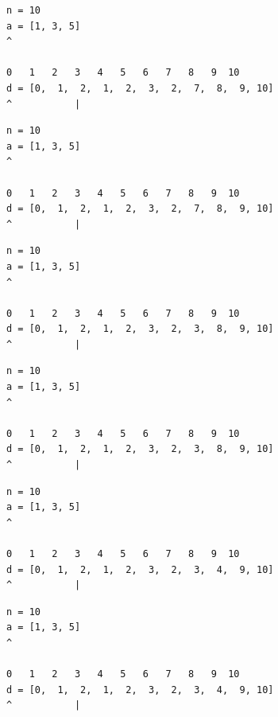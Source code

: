 \begin{frame}[fragile]
\begin{verbatim}
n = 10
a = [1, 3, 5]
^

0   1   2   3   4   5   6   7   8   9  10
d = [0,  1,  2,  1,  2,  3,  2,  7,  8,  9, 10]
^           |
\end{verbatim}
\end{frame}
\addtocounter{framenumber}{-1}

\begin{frame}[fragile]
\begin{verbatim}
n = 10
a = [1, 3, 5]
^

0   1   2   3   4   5   6   7   8   9  10
d = [0,  1,  2,  1,  2,  3,  2,  7,  8,  9, 10]
^           |
\end{verbatim}
\end{frame}
\addtocounter{framenumber}{-1}

\begin{frame}[fragile]
\begin{verbatim}
n = 10
a = [1, 3, 5]
^

0   1   2   3   4   5   6   7   8   9  10
d = [0,  1,  2,  1,  2,  3,  2,  3,  8,  9, 10]
^           |
\end{verbatim}
\end{frame}
\addtocounter{framenumber}{-1}

\begin{frame}[fragile]
\begin{verbatim}
n = 10
a = [1, 3, 5]
^

0   1   2   3   4   5   6   7   8   9  10
d = [0,  1,  2,  1,  2,  3,  2,  3,  8,  9, 10]
^           |
\end{verbatim}
\end{frame}
\addtocounter{framenumber}{-1}

\begin{frame}[fragile]
\begin{verbatim}
n = 10
a = [1, 3, 5]
^

0   1   2   3   4   5   6   7   8   9  10
d = [0,  1,  2,  1,  2,  3,  2,  3,  4,  9, 10]
^           |
\end{verbatim}
\end{frame}
\addtocounter{framenumber}{-1}

\begin{frame}[fragile]
\begin{verbatim}
n = 10
a = [1, 3, 5]
^

0   1   2   3   4   5   6   7   8   9  10
d = [0,  1,  2,  1,  2,  3,  2,  3,  4,  9, 10]
^           |
\end{verbatim}
\end{frame}
\addtocounter{framenumber}{-1}

